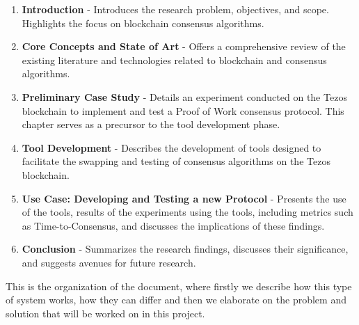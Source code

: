 \begin{enumerate}
\item \textbf{Introduction} - Introduces the research problem, objectives, and scope. Highlights the focus on blockchain consensus algorithms.

\item \textbf{Core Concepts and State of Art} - Offers a comprehensive review of the existing literature and technologies related to blockchain and consensus algorithms.

\item \textbf{Preliminary Case Study} - Details an experiment conducted on the Tezos blockchain to implement and test a Proof of Work consensus protocol. This chapter serves as a precursor to the tool development phase.

\item \textbf{Tool Development} - Describes the development of tools designed to facilitate the swapping and testing of consensus algorithms on the Tezos blockchain.

\item \textbf{Use Case: Developing and Testing a new Protocol} - Presents the use of the tools, results of the experiments using the tools, including metrics such as Time-to-Consensus, and discusses the implications of these findings.

\item \textbf{Conclusion} - Summarizes the research findings, discusses their significance, and suggests avenues for future research.
\end{enumerate}

This is the organization of the document, where firstly we describe how this type of system works, how they can differ and then we elaborate on the problem and solution that will be worked on in this project.
